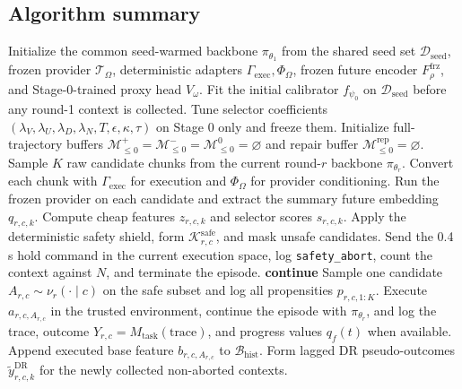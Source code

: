 \documentclass[10pt]{article}
\theoremstyle{plain}
\theoremstyle{definition}
\theoremstyle{remark}
\begin{document}
\subsection{Algorithm summary}
\begin{algorithm}[H]
\caption{CAVER+FASR: roundwise selective verification and failure-aware admission}
\begin{algorithmic}[1]
\State Initialize the common seed-warmed backbone $\pi_{\theta_1}$ from the shared seed set $\mathcal D_{\mathrm{seed}}$, frozen provider $\mathcal T_{\Omega}$, deterministic adapters $\Gamma_{\mathrm{exec}},\Phi_{\Omega}$, frozen future encoder $F_{\rho}^{\mathrm{frz}}$, and Stage-0-trained proxy head $V_{\omega}$.
\State Fit the initial calibrator $f_{\psi_0}$ on $\mathcal D_{\mathrm{seed}}$ before any round-1 context is collected.
\State Tune selector coefficients $(\lambda_V,\lambda_U,\lambda_D,\lambda_N,T,\epsilon,\kappa,\tau)$ on Stage 0 only and freeze them.
\State Initialize full-trajectory buffers $\mathcal M^{+}_{\le 0}=\mathcal M^{-}_{\le 0}=\mathcal M^{0}_{\le 0}=\varnothing$ and repair buffer $\mathcal M^{\mathrm{rep}}_{\le 0}=\varnothing$.
        \State Sample $K$ raw candidate chunks from the current round-$r$ backbone $\pi_{\theta_r}$.
        \State Convert each chunk with $\Gamma_{\mathrm{exec}}$ for execution and $\Phi_{\Omega}$ for provider conditioning.
        \State Run the frozen provider on each candidate and extract the summary future embedding $q_{r,c,k}$.
        \State Compute cheap features $z_{r,c,k}$ and selector scores $s_{r,c,k}$.
        \State Apply the deterministic safety shield, form $\mathcal K^{\mathrm{safe}}_{r,c}$, and mask unsafe candidates.
            \State Send the 0.4 s hold command in the current execution space, log \texttt{safety\_abort}, count the context against $N$, and terminate the episode.
            \State \textbf{continue}
        \EndIf
        \State Sample one candidate $A_{r,c}\sim \nu_r(\cdot\mid c)$ on the safe subset and log all propensities $p_{r,c,1:K}$.
        \State Execute $a_{r,c,A_{r,c}}$ in the trusted environment, continue the episode with $\pi_{\theta_r}$, and log the trace, outcome $Y_{r,c}=M_{\mathrm{task}}(\text{trace})$, and progress values $q_f(t)$ when available.
        \State Append executed base feature $b_{r,c,A_{r,c}}$ to $\mathcal B_{\mathrm{hist}}$.
    \EndFor
    \State Form lagged DR pseudo-outcomes $\tilde y^{\mathrm{DR}}_{r,c,k}$ for the newly collected non-aborted contexts.

\end{algorithmic}
\end{algorithm}
\end{document}
